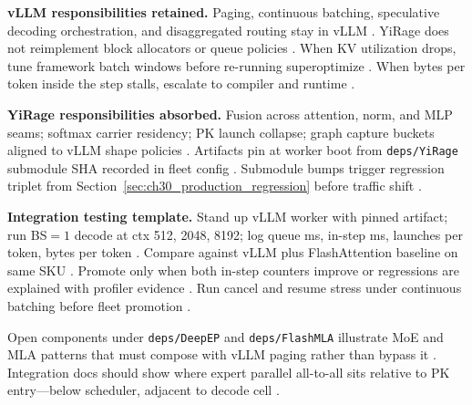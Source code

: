 \textbf{vLLM responsibilities retained.} Paging, continuous batching, speculative decoding orchestration, and disaggregated routing stay in vLLM \citep{kwon2023vllm,patel2025llminference,liu2024deepseekv3,yirage2026,chen2020compilerbasedhardw,dlbook}. YiRage does not reimplement block allocators or queue policies \citep{yirage2026,chen2020compilerbasedhardw,kwon2023vllm,patel2025llminference,dlbook}. When KV utilization drops, tune framework batch windows before re-running superoptimize \citep{kwon2023vllm,patel2025llminference,yirage2026,chen2020compilerbasedhardw,dlbook}. When bytes per token inside the step stalls, escalate to compiler and runtime \citep{memoryfloor2026,yirage2026,chen2020compilerbasedhardw,patel2025llminference,taxbreak2026,dlbook}.

\textbf{YiRage responsibilities absorbed.} Fusion across attention, norm, and MLP seams; softmax carrier residency; PK launch collapse; graph capture buckets aligned to vLLM shape policies \citep{yirage2026,dao2022flashattention,chen2020compilerbasedhardw,nvidia2024cudagraphs,taxbreak2026,memoryfloor2026,patel2025llminference,kwon2023vllm,dlbook}. Artifacts pin at worker boot from \texttt{deps/YiRage} submodule SHA recorded in fleet config \citep{yirage2026,chen2020compilerbasedhardw,patel2025llminference,dlbook}. Submodule bumps trigger regression triplet from Section~\ref{sec:ch30_production_regression} before traffic shift \citep{yirage2026,chen2020compilerbasedhardw,patel2025llminference,taxbreak2026,memoryfloor2026,kwon2023vllm,dlbook}.

\textbf{Integration testing template.} Stand up vLLM worker with pinned artifact; run BS${=}1$ decode at ctx 512, 2048, 8192; log queue ms, in-step ms, launches per token, bytes per token \citep{kwon2023vllm,patel2025llminference,taxbreak2026,memoryfloor2026,yirage2026,chen2020compilerbasedhardw,dlbook}. Compare against vLLM plus FlashAttention baseline on same SKU \citep{dao2022flashattention,kwon2023vllm,patel2025llminference,yirage2026,chen2020compilerbasedhardw,dlbook}. Promote only when both in-step counters improve or regressions are explained with profiler evidence \citep{patel2025llminference,memoryfloor2026,yirage2026,chen2020compilerbasedhardw,taxbreak2026,dlbook}. Run cancel and resume stress under continuous batching before fleet promotion \citep{kwon2023vllm,yirage2026,chen2020compilerbasedhardw,patel2025llminference,dlbook}.

Open components under \texttt{deps/DeepEP} and \texttt{deps/FlashMLA} illustrate MoE and MLA patterns that must compose with vLLM paging rather than bypass it \citep{liu2024deepseekv3,yirage2026,chen2020compilerbasedhardw,patel2025llminference,kwon2023vllm,taxbreak2026,memoryfloor2026,dlbook}. Integration docs should show where expert parallel all-to-all sits relative to PK entry---below scheduler, adjacent to decode cell \citep{liu2024deepseekv3,patel2025llminference,yirage2026,chen2020compilerbasedhardw,dlbook}.

